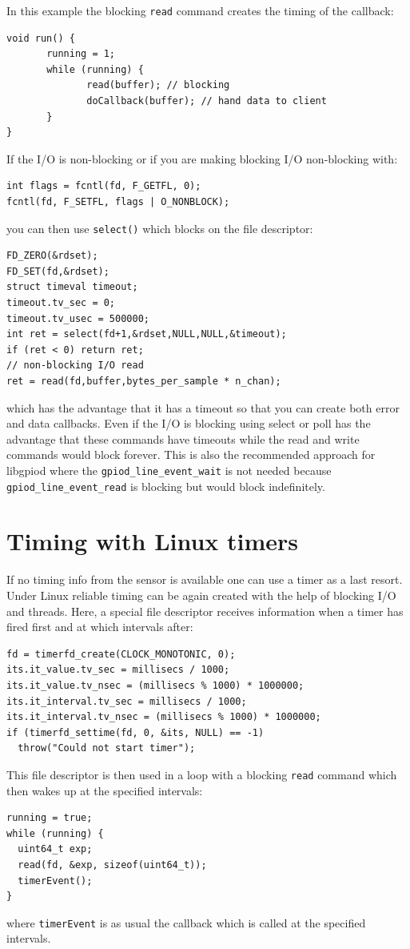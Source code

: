 \documentclass[12pt]{report}
\begin{document}
In this example the blocking \texttt{read} command creates
the timing of the callback:
\begin{verbatim}
void run() {
       running = 1;
       while (running) {
              read(buffer); // blocking
              doCallback(buffer); // hand data to client
       }
}
\end{verbatim}
If the I/O is non-blocking or if you are making blocking I/O non-blocking with:
\begin{verbatim}
int flags = fcntl(fd, F_GETFL, 0);
fcntl(fd, F_SETFL, flags | O_NONBLOCK);
\end{verbatim}
you can then use \texttt{select()} which blocks on the file descriptor:
\begin{verbatim}
FD_ZERO(&rdset);
FD_SET(fd,&rdset);
struct timeval timeout;
timeout.tv_sec = 0;
timeout.tv_usec = 500000;
int ret = select(fd+1,&rdset,NULL,NULL,&timeout);
if (ret < 0) return ret;
// non-blocking I/O read
ret = read(fd,buffer,bytes_per_sample * n_chan);
\end{verbatim}
which has the advantage that it has a timeout so that
you can create both error and data
callbacks. Even if the I/O is blocking using select or poll
has the advantage that these commands have timeouts while
the read and write commands would block forever. This is also
the recommended approach for libgpiod where the \texttt{gpiod\_line\_event\_wait}
is not needed because \texttt{gpiod\_line\_event\_read} is blocking
but would block indefinitely.


\section{Timing with Linux timers}
If no timing info from the sensor is available
one can use a timer as a last resort. Under Linux reliable timing
can be again created with the help of blocking I/O
and threads. Here, a
special file descriptor receives information when a timer
has fired first and at which intervals
after:
\begin{verbatim}
fd = timerfd_create(CLOCK_MONOTONIC, 0);
its.it_value.tv_sec = millisecs / 1000;
its.it_value.tv_nsec = (millisecs % 1000) * 1000000;
its.it_interval.tv_sec = millisecs / 1000;
its.it_interval.tv_nsec = (millisecs % 1000) * 1000000;
if (timerfd_settime(fd, 0, &its, NULL) == -1)
  throw("Could not start timer");
\end{verbatim}
This file descriptor is then used
in a loop with a blocking \texttt{read} command which then
wakes up at the specified intervals:
\begin{verbatim}
running = true;
while (running) {
  uint64_t exp;
  read(fd, &exp, sizeof(uint64_t));
  timerEvent();
}
\end{verbatim}
where \texttt{timerEvent} is as usual the callback which is
called at the specified intervals.
\end{document}
